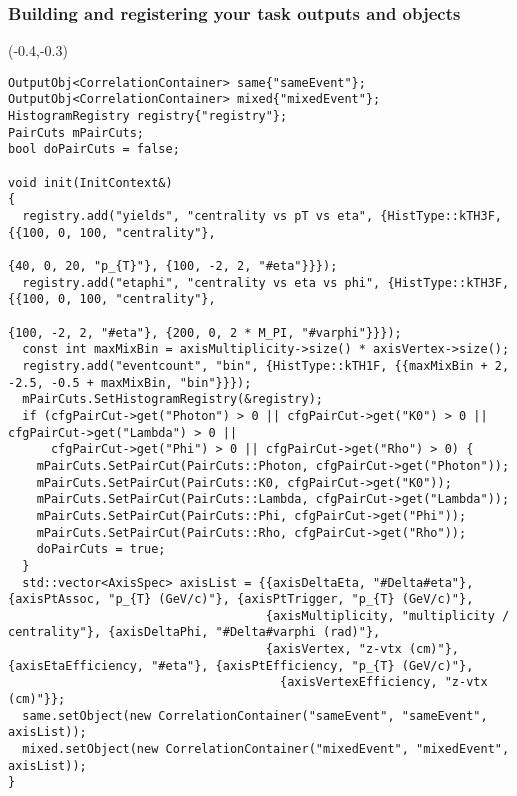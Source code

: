 \documentclass[14pt,aspectratio=169,t]{beamer}
\begin{document}
\begin{frame}[fragile]
  \frametitle{Building and registering your task outputs and objects}
  \begin{textblock}{16}(-0.4,-0.3)
    {\tiny \color{blue}
    \begin{verbatim}
OutputObj<CorrelationContainer> same{"sameEvent"};
OutputObj<CorrelationContainer> mixed{"mixedEvent"};
HistogramRegistry registry{"registry"};
PairCuts mPairCuts;
bool doPairCuts = false;

void init(InitContext&)
{
  registry.add("yields", "centrality vs pT vs eta", {HistType::kTH3F, {{100, 0, 100, "centrality"}, 
                                                                       {40, 0, 20, "p_{T}"}, {100, -2, 2, "#eta"}}});
  registry.add("etaphi", "centrality vs eta vs phi", {HistType::kTH3F, {{100, 0, 100, "centrality"}, 
                                                                        {100, -2, 2, "#eta"}, {200, 0, 2 * M_PI, "#varphi"}}});
  const int maxMixBin = axisMultiplicity->size() * axisVertex->size();
  registry.add("eventcount", "bin", {HistType::kTH1F, {{maxMixBin + 2, -2.5, -0.5 + maxMixBin, "bin"}}});
  mPairCuts.SetHistogramRegistry(&registry);
  if (cfgPairCut->get("Photon") > 0 || cfgPairCut->get("K0") > 0 || cfgPairCut->get("Lambda") > 0 || 
      cfgPairCut->get("Phi") > 0 || cfgPairCut->get("Rho") > 0) {
    mPairCuts.SetPairCut(PairCuts::Photon, cfgPairCut->get("Photon"));
    mPairCuts.SetPairCut(PairCuts::K0, cfgPairCut->get("K0"));
    mPairCuts.SetPairCut(PairCuts::Lambda, cfgPairCut->get("Lambda"));
    mPairCuts.SetPairCut(PairCuts::Phi, cfgPairCut->get("Phi"));
    mPairCuts.SetPairCut(PairCuts::Rho, cfgPairCut->get("Rho"));
    doPairCuts = true;
  }
  std::vector<AxisSpec> axisList = {{axisDeltaEta, "#Delta#eta"}, {axisPtAssoc, "p_{T} (GeV/c)"}, {axisPtTrigger, "p_{T} (GeV/c)"},
                                    {axisMultiplicity, "multiplicity / centrality"}, {axisDeltaPhi, "#Delta#varphi (rad)"},
                                    {axisVertex, "z-vtx (cm)"}, {axisEtaEfficiency, "#eta"}, {axisPtEfficiency, "p_{T} (GeV/c)"},
                                      {axisVertexEfficiency, "z-vtx (cm)"}};
  same.setObject(new CorrelationContainer("sameEvent", "sameEvent", axisList));
  mixed.setObject(new CorrelationContainer("mixedEvent", "mixedEvent", axisList));
}
    \end{verbatim}}
  \end{textblock}
\end{frame}
\end{document}
